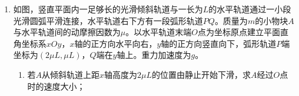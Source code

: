 \documentclass[\gkver]{gaokaozhenti}
\begin{document}
\begin{enumerate}
{	

	磁场半径为$r_{2}$，根据$qvB = m \frac{v^{2}}{r}$可知磁感应强度为

	$B_{2}=\frac{mv}{qr_{2}}$

	根据左手定则可知磁场的方向为垂直纸面向里，圆形磁场的面积为

	$S_{2}=\pi r_{2}^{2}$

	（3）粒子在磁场中运动，3 和 4 为粒子运动的轨迹圆，1 和 2 为粒子运动的磁场的圆周


	根据$qvB = m \frac{v^{2}}{r}$可知Ⅰ和Ⅲ中的磁感应强度为

	$B_{\text{Ⅰ}}=\frac{mv}{qr_{3}}$，$B_{\text{Ⅲ}}=\frac{mv}{qr_{4}}$

	图中箭头部分的实线为粒子运动的轨迹，可知磁场的最小面积为叶子形状，取Ⅰ区域如图


	图中阴影部分面积的一半为四分之一圆周$\widehat{S}_{AOB}$与三角形$S_{AOB}$之差，所以阴影部分的面积为

	$S_{1}=2(\widehat{S}_{AOB}-S_{AOB})=2\times\left(\frac{1}{4}\pi r_{3}^{2}-\frac{1}{2}r_{3}^{2}\right)=\left(\frac{1}{2}\pi-1\right)r_{3}^{2}$

	类似地可知Ⅳ区域的阴影部分面积为

	$S_{\text{Ⅳ}}=2\times\left(\frac{1}{4}\pi r_{4}^{2}-\frac{1}{2}r_{4}^{2}\right)=\left(\frac{1}{2}\pi-1\right)r_{4}^{2}$

	根据对称性可知Ⅱ中的匀强磁场面积为

	$S_{\text{Ⅱ}}=\left(\frac{1}{2}\pi-1\right)r_{3}^{2}$
}

\item
如图，竖直平面内一足够长的光滑倾斜轨道与一长为$L$的水平轨道通过一小段光滑圆弧平滑连接，水平轨道右下方有一段弧形轨道$PQ$。质量为$m$的小物块$A$与水平轨道间的动摩擦因数为$\mu$。以水平轨道末端$O$点为坐标原点建立平面直角坐标系$xOy$，$x$轴的正方向水平向右，$y$轴的正方向竖直向下，弧形轨道$P$端坐标为$(2\mu L,\mu L)$，$Q$端在$y$轴上。重力加速度为$g$。

\begin{enumerate}
	\item
	若$A$从倾斜轨道上距$x$轴高度为$2\mu L$的位置由静止开始下滑，求$A$经过$O$点时的速度大小；


\end{enumerate}
\end{enumerate}
\end{document}
